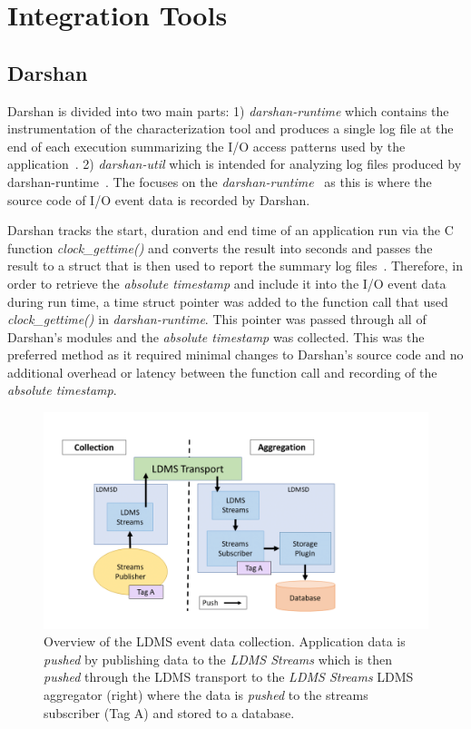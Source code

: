 \section{Integration Tools}
\label{sec:integration}
\subsection{Darshan}
Darshan is divided into two main parts: 1) \emph{darshan-runtime} which contains the instrumentation of the characterization tool and produces a single log file at the end of each execution summarizing the I/O access patterns used by the application~\cite{darshan-doc}. 2) \emph{darshan-util} which is intended for analyzing log files produced by darshan-runtime~\cite{darshan-doc}. The \Darshan{} focuses on the \emph{darshan-runtime}~\cite{darshan-runtime} as this is where the source code of I/O event data is recorded by Darshan.

Darshan tracks the start, duration and end time of an application run via the C function \emph{clock\_gettime()} and converts the result into seconds and passes the result to a struct that is then used to report the summary log files~\cite{darshangithub}. Therefore, in order to retrieve the \emph{absolute timestamp} and include it into the I/O event data during run time, a time struct pointer was added to the function call that used \emph{clock\_gettime()} in \emph{darshan-runtime}. This pointer was passed through all of Darshan's modules and the \emph{absolute timestamp} was collected. This was the preferred method as it required minimal changes to Darshan's source code and no additional overhead or latency between the function call and recording of the \emph{absolute timestamp}. 

\begin{figure}
	\centering
	\includegraphics[trim=0 1cm 1 1.5cm ,clip,width=1.2\linewidth]{figs/ldms-overview.png}
	\caption{Overview of the LDMS event data collection. Application data is \emph{pushed} by publishing data to the \emph{LDMS Streams} which is then \emph{pushed} through the LDMS transport to the \emph{LDMS Streams} LDMS aggregator (right) where the data is \emph{pushed} to the streams subscriber (Tag A) and stored to a database.}
	\label{f:LDMS Overview}
\end{figure}

